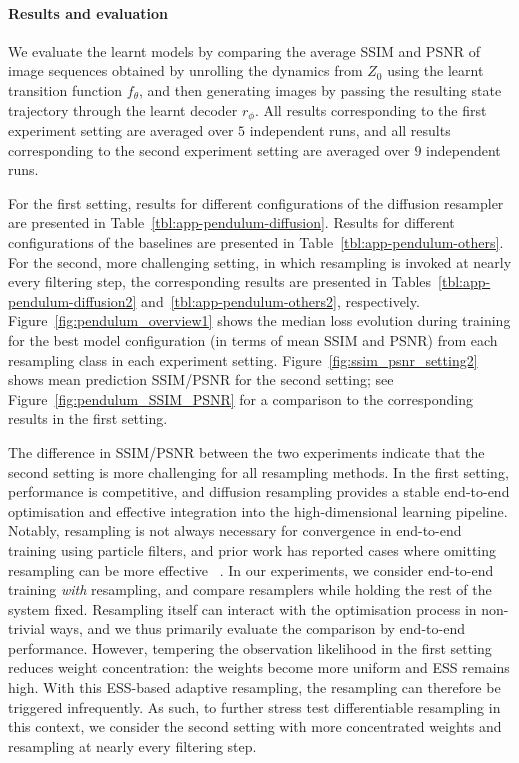 \documentclass{article}
\begin{document}
\paragraph{Results and evaluation}
We evaluate the learnt models by comparing the average SSIM and PSNR of image sequences obtained by unrolling the dynamics from $Z_0$ using the learnt transition function $f_\theta$, and then generating images by passing the resulting state trajectory through the learnt decoder $r_\phi$. All results corresponding to the first experiment setting are averaged over $5$ independent runs, and all results corresponding to the second experiment setting are averaged over $9$ independent runs.

For the first setting, results for different configurations of the diffusion resampler are presented in Table~\ref{tbl:app-pendulum-diffusion}.
Results for different configurations of the baselines are presented in Table~\ref{tbl:app-pendulum-others}. For the second, more challenging setting, in which resampling is invoked at nearly every filtering step, the corresponding results are presented in Tables~\ref{tbl:app-pendulum-diffusion2} and~\ref{tbl:app-pendulum-others2}, respectively.
Figure~\ref{fig:pendulum_overview1} shows the median loss evolution during training for the best model configuration (in terms of mean SSIM and PSNR) from each resampling class in each experiment setting. Figure~\ref{fig:ssim_psnr_setting2} shows mean prediction SSIM/PSNR for the second setting; see Figure~\ref{fig:pendulum_SSIM_PSNR} for a comparison to the corresponding results in the first setting. 

The difference in SSIM/PSNR between the two experiments indicate that the second setting is more challenging for all resampling methods. In the first setting, 
performance is competitive, and diffusion resampling provides a stable end-to-end optimisation and effective integration into the high-dimensional learning pipeline. Notably, resampling is not always necessary for convergence in end-to-end training using particle filters, and prior work has reported cases where omitting resampling can be more effective ~\citep[see, e.g.,][]{Karkus2018}. In our experiments, we consider end-to-end training \emph{with} resampling, and compare resamplers while holding the rest of the system fixed. Resampling itself can interact with the optimisation process in non-trivial ways, and we thus primarily evaluate the comparison by end-to-end performance. 
However, tempering the observation likelihood in the first setting reduces weight concentration: the weights become more uniform and ESS remains high. 
With this ESS-based adaptive resampling, the resampling can therefore be triggered infrequently. 
As such, to further stress test differentiable resampling in this context, we consider the second setting with more concentrated weights and resampling at nearly every filtering step.
\end{document}
